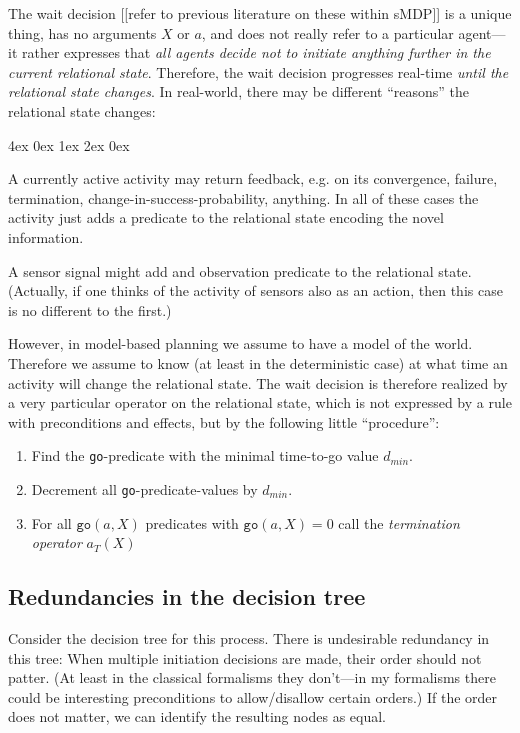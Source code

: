 \documentclass[10pt,fleqn,twoside]{article}
\newenvironment{items}{
\par\small
\begin{list}{--}{\leftmargin4ex \rightmargin0ex \labelsep1ex \labelwidth2ex
\topsep0pt \parsep0ex \itemsep3pt}
}{
\end{list}
}
\newcommand{\go}{{\texttt{go}}}
\begin{document}
The wait decision [[refer to previous literature on these within
sMDP]] is a unique thing, has no arguments $X$ or $a$, and does not
really refer to a particular agent---it rather expresses
that \emph{all agents decide not to initiate anything further in the
current relational state}. Therefore, the wait decision progresses
real-time \emph{until the relational state changes}. In real-world,
there may be different ``reasons'' the relational state changes:
\begin{items}
\item A currently active activity may return feedback, e.g. on its
convergence, failure, termination, change-in-success-probability,
anything. In all of these cases the activity just adds a predicate to
the relational state encoding the novel information.
\item A sensor signal might add and observation predicate to the
relational state. (Actually, if one thinks of the activity of sensors
also as an action, then this case is no different to the first.)
\end{items}

However, in model-based planning we assume to have a model of the
world. Therefore we assume to know (at least in the deterministic
case) at what time an activity will change the
relational state. The wait decision is therefore realized by a very
particular operator on the relational state, which is not expressed by
a rule with preconditions and effects, but by the following little
``procedure'':
\begin{enumerate}
\item Find the \go-predicate with the minimal time-to-go value $d_{min}$.
\item Decrement all \go-predicate-values by $d_{min}$.
\item For all $\go(a,X)$ predicates with $\go(a,X)=0$ call
the \emph{termination operator} $a_T(X)$
\end{enumerate}

\subsection{Redundancies in the decision tree}

Consider the decision tree for this process. There is undesirable
redundancy in this tree: When multiple initiation decisions are made,
their order should not patter. (At least in the classical formalisms they
don't---in my formalisms there could be interesting preconditions to
allow/disallow certain orders.) If the order does not matter, we can
identify the resulting nodes as equal.
\end{document}
